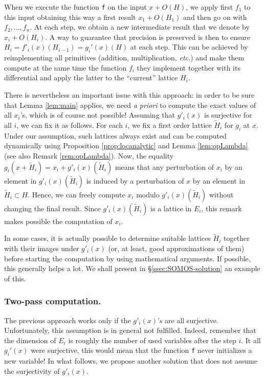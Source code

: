 \documentclass{lms}
\begin{document}
When we execute the function {\tt f} on the input $x + O(H)$, we apply 
first $f_1$ to this input obtaining this way a first result $x_1 + 
O(H_1)$ and then go on with $f_2, \ldots, f_n$. At each step, we obtain 
a new intermediate result that we denote by $x_i + O(H_i)$. A way to 
guarantee that precision is preserved is then to 
ensure $H_i = f'_i(x)(H_{i-1}) = g_i'(x)(H)$ at each step. This can be 
achieved by reimplementing all primitives (addition, multiplication, 
\emph{etc.}) and make them compute at the same time the function $f_i$
they implement together with its differential and apply the latter to
the ``current'' lattice $H_i$.

There is nevertheless an important issue with this approach: in order to 
be sure that Lemma \ref{lem:main} applies, we need \emph{a priori} to 
compute the exact values of all $x_i$'s, which is of course not 
possible! Assuming that $g'_i(x)$ is surjective for all $i$, we can fix 
it as follows. For each $i$, we fix a first order lattice $\tilde H_i$ 
for $g_i$ at $x$. Under our assumption, such lattices always exist and 
can be computed dynamically using Proposition \ref{prop:locanalytic}
and Lemma \ref{lem:opLambda} (see also Remark \ref{rem:opLambda}).
Now, the equality $g_i(x + \tilde H_i) = x_i + g'_i(x)(\tilde H_i)$ 
means that any perturbation of $x_i$ by an element in $g'_i(x) (\tilde 
H_i)$ is induced by a perturbation of $x$ by an element in $\tilde H_i 
\subset H$. Hence, we can freely compute $x_i$ modulo $g'_i(x) (\tilde 
H_i)$ without changing the final result. Since $g'_i(x)(\tilde H_i)$ is 
a lattice in $E_i$, this remark makes possible the computation of $x_i$.

\begin{rmk}
In some cases, it is actually possible to determine suitable lattices 
$\tilde H_i$ together with their images under $g'_i(x)$ (or, at
least, good approximations of them) before starting the computation 
by using mathematical arguments. If possible, this generally helps a
lot. We shall present in \S \ref{ssec:SOMOS-solution} an example of 
this.
\end{rmk}

\subsubsection*{Two-pass computation.}

The previous approach works only if the $g'_i(x)$'s are all surjective. 
Unfortunately, this assumption is in general not fulfilled. Indeed, 
remember that the dimension of $E_i$ is roughly the number of used 
variables after the step $i$. It all $g_i'(x)$ were surjective, this 
would mean that the function {\tt f} never initializes a new variable!
In what follows, we propose another solution that does not assume the
surjectivity of $g'_i(x)$.
\end{document}
